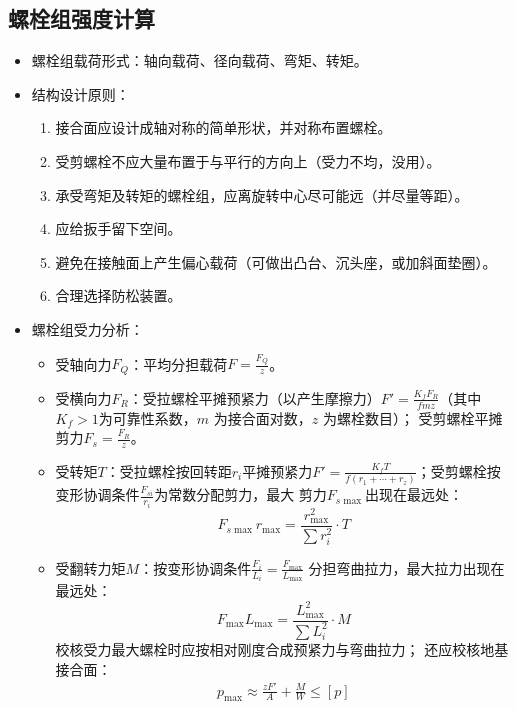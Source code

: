\documentclass[12pt,a4paper]{article}
\newcommand{\tightlist}{\setlength{\parskip}{0pt}\setlength{\itemsep}{0pt}}
\newcommand{\hint}[1]{\textsf{（#1）}}
\newcommand{\minor}[1]{{\color{gray} #1}}
\begin{document}
\subsection{螺栓组强度计算}
\begin{itemize}\tightlist
    \item 螺栓组载荷形式：轴向载荷、径向载荷、弯矩、转矩。
    \item 结构设计原则：
    \begin{enumerate}\tightlist
        \item 接合面应设计成轴对称的简单形状，并对称布置螺栓。
        \item 受剪螺栓不应大量布置于与平行的方向上\hint{受力不均，没用}。
        \item 承受弯矩及转矩的螺栓组，应离旋转中心尽可能远\hint{并尽量等距}。
        \item 应给扳手留下空间。
        \item 避免在接触面上产生偏心载荷\hint{可做出凸台、沉头座，或加斜面垫圈}。
        \item 合理选择防松装置。
    \end{enumerate}
    \item 螺栓组受力分析：
    \begin{itemize}\tightlist
        \item 受轴向力$F_Q$：平均分担载荷$F=\frac{F_Q}{z}$。
        \item 受横向力$F_R$：受拉螺栓平摊预紧力\hint{以产生摩擦力}$F'=
        \frac{K_fF_R}{fmz}$\hint{其中$K_f>1$为可靠性系数，$m$ 为接合面对数，$z$ 为螺栓数目}；
        受剪螺栓平摊剪力$F_s=\frac{F_R}{z}$。
        \item 受转矩$T$：受拉螺栓按回转距$r_i$平摊预紧力$F'=\frac{K_fT}{f(r_1+
        \cdots+r_z)}$；受剪螺栓按变形协调条件$\frac{F_{si}}{r_i}$为常数分配剪力，最大
        剪力$F_{s\max}$出现在最远处：
        \begin{equation}
        F_{s\max}r_{\max}=\frac{r_{\max}^2}{\sum r_i^2}\cdot T
        \end{equation}
        \item 受翻转力矩$M$：按变形协调条件$\frac{F_i}{L_i}=\frac{F_{\max}}{L_{\max}}$
        分担弯曲拉力，最大拉力出现在最远处：
        \begin{equation}
        F_{\max}L_{\max}=\frac{L_{\max}^2}{\sum L_i^2}\cdot M
        \end{equation}
        校核受力最大螺栓时应按相对刚度合成预紧力与弯曲拉力；\minor{还应校核地基接合面：
        \begin{gather}
        p_{\max}\approx\frac{zF'}{A}+\frac{M}{W}\leq[p]\\

\end{gather}}
\end{itemize}
\end{itemize}
\end{document}
